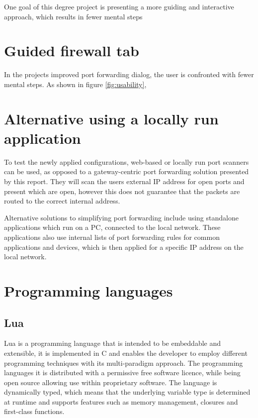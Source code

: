 \documentclass[a4paper,11pt,makeidx]{kth-bcs}
\begin{document}
One goal of this degree project is presenting a more guiding and interactive approach, which results in fewer mental steps

\section{Guided firewall tab}
In the projects improved port forwarding dialog, the user is confronted with fewer mental steps.
As shown in figure \ref{fig:usability}, 

\section{Alternative using a locally run application}
To test the newly applied configurations, web-based or locally run port scanners can be used, as opposed to a gateway-centric port forwarding solution presented by this report.
They will scan the users external IP address for open ports and present which are open, however this does not guarantee that the packets are routed to the correct internal address.

Alternative solutions to simplifying port forwarding include using standalone applications which run on a PC, connected to the local network.
These applications also use internal lists of port forwarding rules for common applications and devices, which is then applied for a specific IP address on the local network.\cite{portforward.com}

\section{Programming languages}
\subsection{Lua}
Lua is a programming language that is intended to be embeddable and extensible, it is implemented in C and enables the developer to employ different programming techniques with its multi-paradigm approach.
The programming languages it is distributed with a permissive free software licence\cite{mit-license}, while being open source allowing use within proprietary software.
The language is dynamically typed, which means that the underlying variable type is determined at runtime and supports features such as memory management, closures and first-class functions.\nocite{ierusalimschy2006programming}
\end{document}
